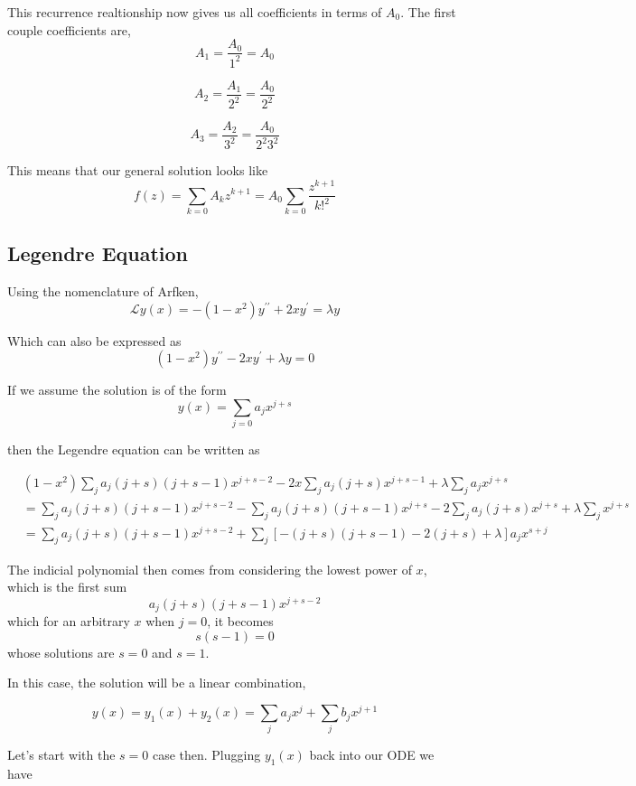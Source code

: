 This recurrence realtionship now gives us all coefficients in terms of $A_0$.
The first couple coefficients are,
$$
A_1 = \frac{ A_0 }{1^2} = A_0
$$

$$
A_2 = \frac{ A_1 }{2^2} = \frac{ A_0 }{2^2}
$$

$$
A_3 = \frac{ A_2 }{3^2} = \frac{ A_0 }{2^2 3^2}
$$

This means that our general solution looks like
$$
f(z) = \sum_{k=0} A_k z^{k+1}
= A_0 \sum_{k=0} \frac{ z^{k+1} }{k!^2}
$$




\subsection{Legendre Equation}

Using the nomenclature of Arfken,
$$
\mathcal{L} y(x) =
-(1-x^2) y^{\prime\prime} + 2x y^\prime = \lambda y
$$

Which can also be expressed as
$$
(1-x^2) y^{\prime\prime} - 2x y^\prime + \lambda y = 0
$$

If we assume the solution is of the form
$$
y(x) =
\sum_{j=0} a_j x^{j+s}
$$

then the Legendre equation can be written as

\begin{align*}
& (1-x^2) \sum_{j} a_j (j+s)(j+s-1) x^{j+s-2}
    - 2x \sum_{j} a_j (j+s) x^{j+s-1}
    + \lambda \sum_{j} a_j x^{j+s} \\
&= \sum_{j} a_j (j+s)(j+s-1) x^{j+s-2}
    - \sum_{j} a_j (j+s)(j+s-1) x^{j+s}
    -2 \sum_{j} a_j (j+s) x^{j+s}
    + \lambda \sum_{j} x^{j+s} \\
&= \sum_{j} a_j (j+s)(j+s-1) x^{j+s-2}
    + \sum_j \left[ -(j+s)(j+s-1) -2(j+s) + \lambda \right] a_j x^{s+j}
\end{align*}

The indicial polynomial then comes from considering the lowest power of $x$, which is the first sum
$$
a_j (j+s)(j+s-1) x^{j+s-2}
$$
which for an arbitrary $x$ when $j=0$, it becomes
$$
s(s-1) = 0
$$
whose solutions are $s=0$ and $s=1$.

In this case, the solution will be a linear combination,

$$
y(x) = y_1 (x) + y_2 (x)
= \sum_j a_j x^{j} + \sum_j b_j x^{j+1}
$$

Let's start with the $s=0$ case then.
Plugging $y_1 (x)$ back into our ODE we have

